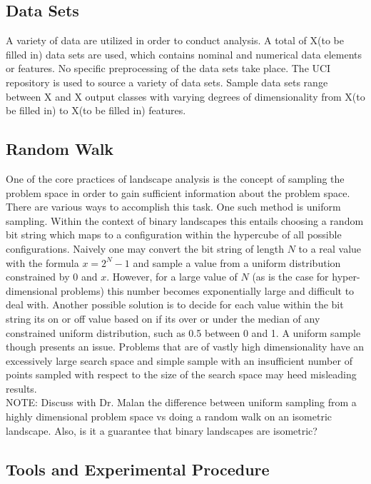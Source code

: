 \documentclass[journal,comsoc]{IEEEtran}
\begin{document}
\subsection{Data Sets}

A variety of data are utilized in order to conduct analysis. A total of X(to be filled in) data sets are used, which contains nominal and numerical data elements or features. No specific preprocessing of the data sets take place. The UCI repository is used to source a variety of data sets. Sample data sets range between X and X output classes with varying degrees of dimensionality from X(to be filled in) to X(to be filled in) features.

\subsection{Random Walk}

One of the core practices of landscape analysis is the concept of sampling the problem space in order to gain sufficient information about the problem space. There are various ways to accomplish this task. One such method is uniform sampling. Within the context of binary landscapes this entails choosing a random bit string which maps to a configuration within the hypercube of all possible configurations. Naively one may convert the bit string of length $N$ to a real value with the formula $x = 2^N-1$ and sample a value from a uniform distribution constrained by 0 and $x$. However, for a large value of $N$ (as is the case for hyper-dimensional problems) this number becomes exponentially large and difficult to deal with. Another possible solution is to decide for each value within the bit string its on or off value based on if its over or under the median of any constrained uniform distribution, such as 0.5 between 0 and 1. A uniform sample though presents an issue. Problems that are of vastly high dimensionality have an excessively large search space and simple sample with an insufficient number of points sampled with respect to the size of the search space may heed misleading results.\\

NOTE: Discuss with Dr. Malan the difference between uniform sampling from a highly dimensional problem space vs doing a random walk on an isometric landscape. Also, is it a guarantee that binary landscapes are isometric?

\subsection{Tools and Experimental Procedure}
\end{document}
